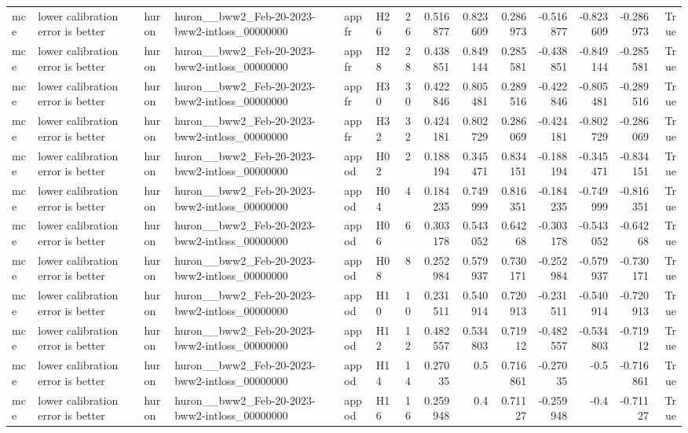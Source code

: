 \begin{longtable}{llllllrrrrrrrr}
mce & lower calibration error is better & huron & huron\_\_bww2\_Feb-20-2023-bww2-intloss\_00000000 & appfr & H26 & 26 & 0.516877 & 0.823609 & 0.286973 & -0.516877 & -0.823609 & -0.286973 & True \\
mce & lower calibration error is better & huron & huron\_\_bww2\_Feb-20-2023-bww2-intloss\_00000000 & appfr & H28 & 28 & 0.438851 & 0.849144 & 0.285581 & -0.438851 & -0.849144 & -0.285581 & True \\
mce & lower calibration error is better & huron & huron\_\_bww2\_Feb-20-2023-bww2-intloss\_00000000 & appfr & H30 & 30 & 0.422846 & 0.805481 & 0.289516 & -0.422846 & -0.805481 & -0.289516 & True \\
mce & lower calibration error is better & huron & huron\_\_bww2\_Feb-20-2023-bww2-intloss\_00000000 & appfr & H32 & 32 & 0.424181 & 0.802729 & 0.286069 & -0.424181 & -0.802729 & -0.286069 & True \\
mce & lower calibration error is better & huron & huron\_\_bww2\_Feb-20-2023-bww2-intloss\_00000000 & appod & H02 & 2 & 0.188194 & 0.345471 & 0.834151 & -0.188194 & -0.345471 & -0.834151 & True \\
mce & lower calibration error is better & huron & huron\_\_bww2\_Feb-20-2023-bww2-intloss\_00000000 & appod & H04 & 4 & 0.184235 & 0.749999 & 0.816351 & -0.184235 & -0.749999 & -0.816351 & True \\
mce & lower calibration error is better & huron & huron\_\_bww2\_Feb-20-2023-bww2-intloss\_00000000 & appod & H06 & 6 & 0.303178 & 0.543052 & 0.64268 & -0.303178 & -0.543052 & -0.64268 & True \\
mce & lower calibration error is better & huron & huron\_\_bww2\_Feb-20-2023-bww2-intloss\_00000000 & appod & H08 & 8 & 0.252984 & 0.579937 & 0.730171 & -0.252984 & -0.579937 & -0.730171 & True \\
mce & lower calibration error is better & huron & huron\_\_bww2\_Feb-20-2023-bww2-intloss\_00000000 & appod & H10 & 10 & 0.231511 & 0.540914 & 0.720913 & -0.231511 & -0.540914 & -0.720913 & True \\
mce & lower calibration error is better & huron & huron\_\_bww2\_Feb-20-2023-bww2-intloss\_00000000 & appod & H12 & 12 & 0.482557 & 0.534803 & 0.71912 & -0.482557 & -0.534803 & -0.71912 & True \\
mce & lower calibration error is better & huron & huron\_\_bww2\_Feb-20-2023-bww2-intloss\_00000000 & appod & H14 & 14 & 0.27035 & 0.5 & 0.716861 & -0.27035 & -0.5 & -0.716861 & True \\
mce & lower calibration error is better & huron & huron\_\_bww2\_Feb-20-2023-bww2-intloss\_00000000 & appod & H16 & 16 & 0.259948 & 0.4 & 0.71127 & -0.259948 & -0.4 & -0.71127 & True \\

\end{longtable}

